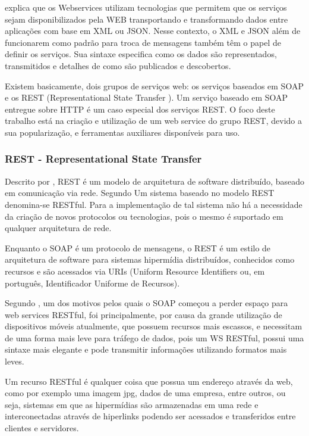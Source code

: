 \documentclass[12pt]{article}
\begin{document}
\cite{souza04} explica que os Webservices utilizam tecnologias que permitem que
os serviços sejam disponibilizados pela WEB transportando e transformando dados
entre aplicações com base em XML ou JSON. Nesse contexto, o XML e JSON além de
funcionarem como padrão para troca de mensagens também têm o papel de definir os
serviços. Sua sintaxe especifica como os dados são representados, transmitidos e
detalhes de como são publicados e descobertos.

Existem basicamente, dois grupos de serviços web: os serviços baseados em SOAP e os REST (Representational
State Transfer ). Um serviço baseado em SOAP entregue sobre HTTP é um caso especial dos serviços REST. O foco deste trabalho está na criação e utilização de um web service do grupo REST, devido a sua popularização, e ferramentas auxiliares disponíveis para uso.

\subsubsection{REST - Representational State Transfer}

Descrito por \cite{rest}, REST é um modelo de arquitetura de software distribuído, baseado em comunicação via rede.
Segundo \cite{richard:07} Um sistema baseado no modelo REST denomina-se RESTful. Para a implementação de tal sistema não há a necessidade da criação de novos protocolos ou tecnologias, pois o mesmo é suportado em qualquer arquitetura de rede.

Enquanto o SOAP é um protocolo de mensagens, o REST é um estilo de arquitetura
de software para sistemas hipermídia distribuídos, conhecidos como recursos e são acessados via URIs (Uniform Resource Identifiers ou, em português, Identificador Uniforme de Recursos). 

Segundo \cite{lecheta:15}, um dos motivos pelos quais o SOAP começou a perder espaço para web services RESTful, foi principalmente, por causa da grande utilização de dispositivos móveis atualmente, que possuem recursos mais escassos, e necessitam de uma forma mais leve para tráfego de dados, pois um WS RESTful, possui uma sintaxe mais elegante e pode transmitir informações utilizando formatos mais leves.

Um recurso RESTful é qualquer coisa que possua um endereço através da web, como por exemplo uma imagem jpg, dados de uma empresa, entre outros, ou seja, sistemas em que as hipermídias são armazenadas em uma rede e interconectadas através de hiperlinks podendo ser acessados e transferidos entre clientes e servidores.
\end{document}
